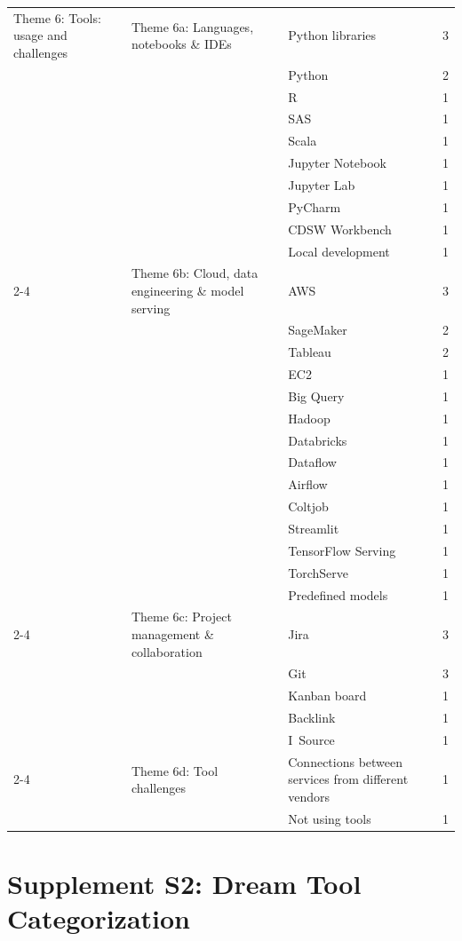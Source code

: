 \documentclass[11pt]{article}
\begin{document}
\begin{longtable}{@{}p{3.5cm} p{3.5cm} p{6.0cm} c@{}}
Theme 6: Tools: usage and challenges
  & Theme 6a: Languages, notebooks \& IDEs
  & Python libraries & 3 \\
   &
  & Python & 2 \\
   &
  & R & 1 \\
   &
  & SAS & 1 \\
   &
  & Scala & 1 \\
   &
  & Jupyter Notebook & 1 \\
   &
  & Jupyter Lab & 1 \\
   &
  & PyCharm & 1 \\
   &
  & CDSW Workbench & 1 \\
   &
  & Local development & 1 \\
\cmidrule(lr){2-4}
  & Theme 6b: Cloud, data engineering \& model serving
  & AWS & 3 \\
   &
  & SageMaker & 2 \\
   &
  & Tableau & 2 \\
   &
  & EC2 & 1 \\
   &
  & Big Query & 1 \\
   &
  & Hadoop & 1 \\
   &
  & Databricks & 1 \\
   &
  & Dataflow & 1 \\
   &
  & Airflow & 1 \\
   &
  & Coltjob & 1 \\
   &
  & Streamlit & 1 \\
   &
  & TensorFlow Serving & 1 \\
   &
  & TorchServe & 1 \\
   &
  & Predefined models & 1 \\
\cmidrule(lr){2-4}
  & Theme 6c: Project management \& collaboration
  & Jira & 3 \\
   &
  & Git & 3 \\
   &
  & Kanban board & 1 \\
   &
  & Backlink & 1 \\
   &
  & I~Source & 1 \\
\cmidrule(lr){2-4}
  & Theme 6d: Tool challenges
  & Connections between services from different vendors & 1 \\
   &
  & Not using tools & 1 \\
\end{longtable}

\clearpage

\section*{Supplement S2: Dream Tool Categorization}
\label{sec:supp_dream_tools}
\end{document}
